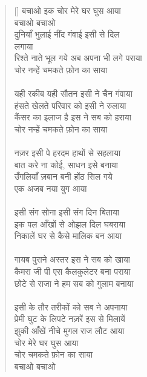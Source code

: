 \begin{verse}[\versewidth]\texthindi{
बचाओ इक चोर मेरे घर घुस आया\\
बचाओ बचाओ\\
दुनियाँ भुलाई नींद गंवाई इसी से दिल\\
लगाया\\
रिश्ते नाते भूल गये अब अपना भी लगे पराया\\
चोर नन्हें चमकते फ़ोन का साया\\
\\
यही रकीब यही सौतन इसी ने चैन गंवाया\\
हंसते खेलते परिवार को इसी ने रुलाया\\
कैंसर का इलाज है इस ने सब को हराया\\
चोर नन्हें चमकते फ़ोन का साया\\
\\
नज़र इसी पे हरदम हाथों से सहलाया\\
बात करे ना कोई, साधन इसे बनाया\\
उँगलियाँ ज़बान बनी होंठ सिल गये\\
एक अजब नया युग आया\\
\\
इसी संग सोना इसी संग दिन बिताया\\
इक पल आँखों से ओझल दिल घबराया\\
निकालें घर से कैसे मालिक बन आया\\
\\
गायब पुराने अस्तर इस ने सब को खाया\\
कैमरा जी पी एस कैलकुलेटर बना पराया\\
छोटे से राजा ने हम सब को गुलाम बनाया\\
\\
इसी के तौर तरीकों को सब ने अपनाया\\
प्रेमी घुट के लिपटे नज़रें इस से मिलायें\\
झुकी आँखें नीचे मुगल राज लौट आया\\
चोर मेरे घर घुस आया\\
चोर चमकते फ़ोन का साया\\
बचाओ बचाओ
}\end{verse}


